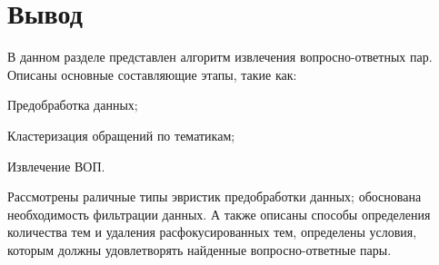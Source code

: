 \section{Вывод}
\label{sec:dev_concl}

В данном разделе представлен алгоритм извлечения вопросно-ответных пар. Описаны основные составляющие этапы, такие как:

\begin{itemize*}
\item Предобработка данных;
\item Кластеризация обращений по тематикам;
\item Извлечение ВОП.
\end{itemize*}

Рассмотрены раличные типы эвристик предобработки данных; обоснована необходимость фильтрации данных. А также описаны способы определения количества тем и удаления расфокусированных тем, определены условия, которым должны удовлетворять найденные вопросно-ответные пары.